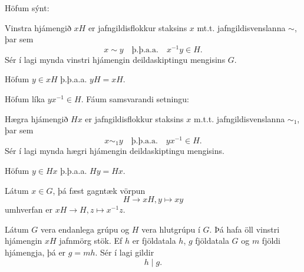 \documentclass[a4paper,icelandic,11pt]{book}
\theoremstyle{plain}
\begin{document}
Höfum sýnt:
\begin{setn}
Vinstra hjámengið $xH$ er jafngildisflokkur staksins $x$ mt.t.
jafngildisvenslanna $\sim$, þar sem 
\begin{equation*}
  x\sim y \quad\text{þ.þ.a.a.} \quad x^{-1}y\in H.
\end{equation*}
Sér í lagi mynda vinstri hjámengin deildaskiptingu mengisins $G$.
\end{setn}
\begin{fylgisetn}
  Höfum $y \in xH$ þ.þ.a.a. $yH = xH$.
\end{fylgisetn}
Höfum líka $yx^{-1}\in H$. Fáum samsvarandi setningu:
\begin{setn}
  Hægra hjámengið $Hx$ er jafngildisflokkur staksins $x$ m.t.t.
  jafngildisvenslanna $\sim_1$, þar sem
  \begin{equation*}
    x\sim_1 y \quad\text{þ.þ.a.a.}\quad yx^{-1}\in H.
  \end{equation*}
  Sér í lagi mynda hægri hjámengin deildaskiptingu mengisins.
\end{setn}
\begin{fylgisetn}
  Höfum $y\in Hx$ þ.þ.a.a. $Hy= Hx$. 
\end{fylgisetn}
Látum $x\in G$, þá fæst gagntæk vörpun
\begin{equation*}
  H\to xH, y\mapsto xy
\end{equation*}
umhverfan er $xH\to H, z\mapsto x^{-1}z$.
\begin{fylgisetn}
    Látum $G$ vera endanlega grúpu og $H$ vera hlutgrúpu í $G$. Þá hafa öll
    vinstri hjámengin $xH$ jafnmörg stök. Ef $h$ er fjöldatala $h$, $g$
    fjöldatala $G$ og $m$ fjöldi hjámengja, þá er $g = mh$. Sér í lagi gildir
    \[
      h \mid g.
    \]
\end{fylgisetn}
\end{document}
